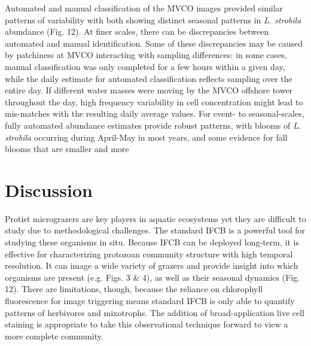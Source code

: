 Automated and manual classification of the MVCO images provided similar patterns of variability with both showing distinct seasonal patterns in \textit{L. strobila} abundance (Fig. 12). At finer scales, there can be discrepancies between automated and manual identification. Some of these discrepancies may be caused by patchiness at MVCO interacting with sampling differences: in some cases, manual classification was only completed for a few hours within a given day, while the daily estimate for automated classification reflects sampling over the entire day. If different water masses were moving by the MVCO offshore tower throughout the day, high frequency variability in cell concentration might lead to mis-matches with the resulting daily average values. For event- to seasonal-scales, fully automated abundance estimates provide robust patterns, with blooms of \textit{L. strobila} occurring during April-May in most years, and some evidence for fall blooms that are smaller and more

\section{Discussion}
Protist micrograzers are key players in aquatic ecosystems yet they are difficult to study due to methodological challenges. The standard IFCB is a powerful tool for studying these organisms in situ. Because IFCB can be deployed long-term, it is effective for characterizing protozoan community structure with high temporal resolution. It can image a wide variety of grazers and provide insight into which organisms are present (e.g. Figs. 3 \& 4), as well as their seasonal dynamics (Fig. 12). There are limitations, though, because the reliance on chlorophyll fluorescence for image triggering means standard IFCB is only able to quantify patterns of herbivores and mixotrophs. The addition of broad-application live cell staining is appropriate to take this observational technique forward to view a more complete community.

